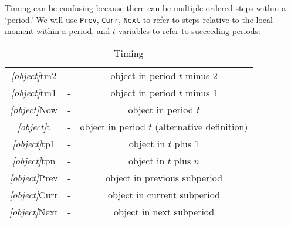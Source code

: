 \documentclass[12pt]{econtex}
\begin{document}
Timing can be confusing because there can be multiple ordered steps 
within a `period.'  We will use \texttt{Prev}, \texttt{Curr}, \texttt{Next} to refer
to steps relative to the local moment within a period, and $t$ variables to refer to succeeding periods:
\begin{table}[h]
	\centering 
	\begin{tabular}{|>{\ttfamily}ccc|} 		
		\hline
   \textit{[object]}tm2 & - & object in period $t$ minus 2 
\\ \textit{[object]}tm1 & - & object in period $t$ minus 1 
\\ \textit{[object]}Now & - & object in period $t$
\\ \textit{[object]}t   & - & object in period $t$ (alternative definition)
\\ \textit{[object]}tp1 & - & object in $t$ plus 1 
\\ \textit{[object]}tpn & - & object in $t$ plus $n$ 
\\ \textit{[object]}Prev & - & object in previous subperiod
\\ \textit{[object]}Curr & - & object in current subperiod
\\ \textit{[object]}Next & - & object in next subperiod
\\	\hline
	\end{tabular}
	\caption{Timing}
	\label{table:Timing}
\end{table}	


\end{document}
